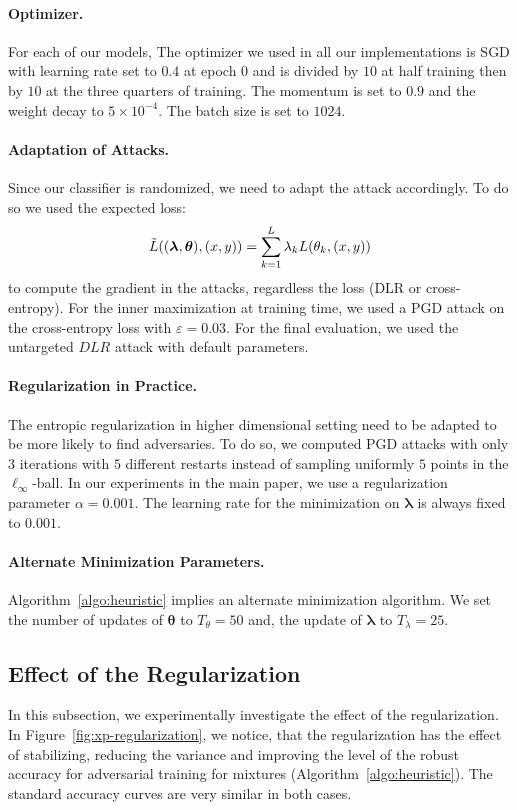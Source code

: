 \paragraph{Optimizer.} For each of our models, The optimizer we used in all our implementations is SGD with learning rate set to $0.4$ at epoch $0$ and is divided by $10$ at half training then by $10$ at the three quarters of training. The momentum is set to $0.9$ and the weight decay to $5\times10^{-4}$. The batch size is set to $1024$. 
\paragraph{Adaptation of Attacks.} Since our classifier is randomized, we need to adapt the attack accordingly. To do so we used the expected loss:
\begin{align*}
\Tilde{\loss}\left((\bm{\lambda},\bm{\theta}),(x,y)\right) = \sum_{k=1}^L \lambda_k \loss(\theta_k,(x,y))
\end{align*}
to compute the gradient in the attacks, regardless the loss (DLR or cross-entropy). For the inner maximization at training time, we used a PGD attack on the cross-entropy loss with $\varepsilon=0.03$. For the final evaluation, we used the untargeted $DLR$ attack with default parameters.
\paragraph{Regularization in Practice.} The entropic regularization in higher dimensional setting need to be adapted to be more likely to find adversaries. To do so, we computed PGD attacks with only $3$ iterations with $5$ different restarts instead of sampling uniformly $5$ points  in the $\ell_\infty$-ball. In our experiments in the main paper, we use a regularization parameter $\alpha=0.001$. The learning rate for the minimization on $\bm{\lambda}$ is always fixed to $0.001$. 
\paragraph{Alternate Minimization Parameters.} Algorithm~\ref{algo:heuristic} implies an alternate minimization algorithm. We set the number of updates of $\bm{\theta}$ to $T_\theta = 50$ and, the update of $\bm{\lambda}$ to $T_\lambda = 25$. 

\subsection{Effect of the Regularization}
In this subsection, we experimentally investigate the effect of the regularization. In Figure~\ref{fig:xp-regularization}, we notice, that the regularization has the effect of stabilizing, reducing the variance and improving the level of the robust accuracy for adversarial training for mixtures (Algorithm~\ref{algo:heuristic}). The standard accuracy curves are very similar in both cases.



